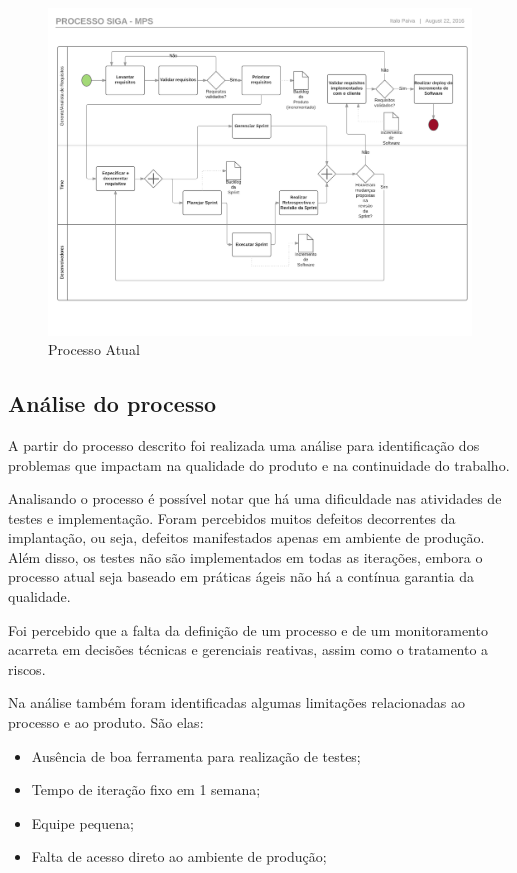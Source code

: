 \begin{figure}[!ht]
\centering
\includegraphics[scale=0.5]{figuras/processo_atual.png}
\caption{Processo Atual}
\label{fig:processo_atual}
\end{figure}


\subsection{Análise do processo}

A partir do processo descrito foi realizada uma análise para identificação dos problemas que impactam na qualidade do produto 
e na continuidade do trabalho. 

Analisando o processo é possível notar que há uma dificuldade nas atividades de testes e implementação. Foram percebidos
muitos defeitos decorrentes da implantação, ou seja, defeitos manifestados apenas em ambiente de produção. Além disso, 
os testes não são implementados em todas as iterações, embora o processo atual seja baseado em práticas ágeis não há a 
contínua garantia da qualidade. 

Foi percebido que a falta da definição de um processo e de um monitoramento acarreta em 
decisões técnicas e gerenciais reativas, assim como o tratamento a riscos. 

Na análise também foram identificadas algumas limitações relacionadas ao processo e ao produto. São elas: 

\begin{itemize}
  \item Ausência de boa ferramenta para realização de testes;
  \item Tempo de iteração fixo em 1 semana;
  \item Equipe pequena;
  \item Falta de acesso direto ao ambiente de produção;
\end{itemize}

